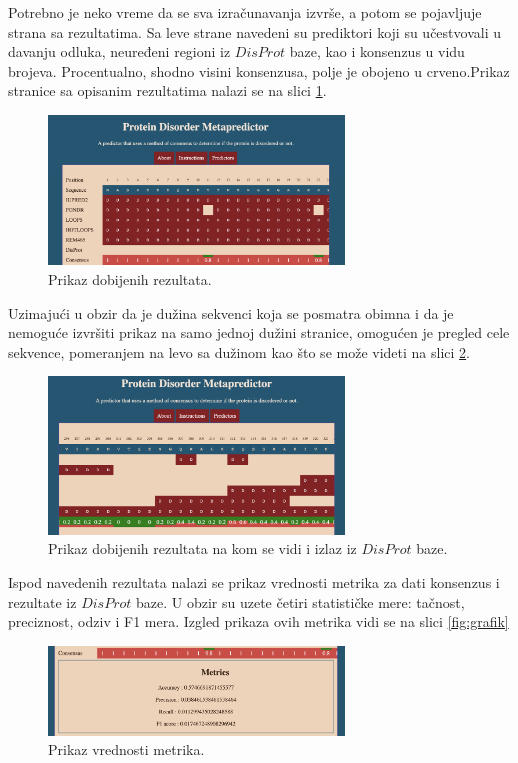 Potrebno je neko vreme da se sva izračunavanja izvrše, a potom se pojavljuje strana sa rezultatima. Sa leve strane navedeni su prediktori koji su učestvovali u davanju odluka, neuređeni regioni iz $DisProt$ baze, kao i konsenzus u vidu brojeva. Procentualno, shodno visini konsenzusa, polje je obojeno u crveno.Prikaz stranice sa opisanim rezultatima nalazi se na slici \ref{fig:results}.
\begin{figure}[H]
	\centering
    \includegraphics[width=0.7\textwidth]{Figures/App/fourth_screen.png}
    \caption{Prikaz dobijenih rezultata.}
    \label{fig:results}
\end{figure}
Uzimajući u obzir da je dužina sekvenci koja se posmatra obimna i da je nemoguće izvršiti prikaz na samo jednoj dužini stranice, omogućen je pregled cele sekvence, pomeranjem na levo sa dužinom kao što se može videti na slici  \ref{fig:disprotrez}.
\begin{figure}[H]
	\centering
    \includegraphics[width=0.7\textwidth]{Figures/App/fifth_screen.png}
    \caption{Prikaz dobijenih rezultata na kom se vidi i izlaz iz $DisProt$ baze.}
    \label{fig:disprotrez}
\end{figure}

Ispod navedenih rezultata nalazi se prikaz vrednosti metrika za dati konsenzus i rezultate iz $DisProt$ baze. U obzir su uzete četiri statističke mere: tačnost, preciznost, odziv i F1 mera. Izgled prikaza ovih metrika vidi se na slici \ref{fig:grafik}

\begin{figure}[H]
	\centering
    \includegraphics[width=0.7\textwidth]{Figures/App/seventh_screen.png}
    \caption{Prikaz vrednosti metrika.}
    \label{fig:metrike}
\end{figure}

